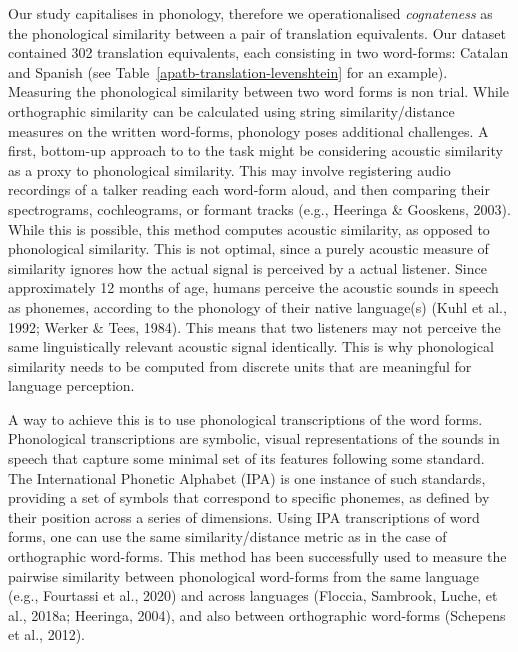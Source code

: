 \documentclass[
  man,
  floatsintext,
  colorlinks=true,linkcolor=blue,citecolor=blue,urlcolor=blue,biblatex]{apa7}
\begin{document}
Our study capitalises in phonology, therefore we operationalised
\emph{cognateness} as the phonological similarity between a pair of
translation equivalents. Our dataset contained 302 translation
equivalents, each consisting in two word-forms: Catalan and Spanish (see
Table~\ref{apatb-translation-levenshtein} for an example). Measuring the
phonological similarity between two word forms is non trial. While
orthographic similarity can be calculated using string
similarity/distance measures on the written word-forms, phonology poses
additional challenges. A first, bottom-up approach to to the task might
be considering acoustic similarity as a proxy to phonological
similarity. This may involve registering audio recordings of a talker
reading each word-form aloud, and then comparing their spectrograms,
cochleograms, or formant tracks (e.g., Heeringa \& Gooskens, 2003).
While this is possible, this method computes acoustic similarity, as
opposed to phonological similarity. This is not optimal, since a purely
acoustic measure of similarity ignores how the actual signal is
perceived by a actual listener. Since approximately 12 months of age,
humans perceive the acoustic sounds in speech as phonemes, according to
the phonology of their native language(s) (Kuhl et al., 1992; Werker \&
Tees, 1984). This means that two listeners may not perceive the same
linguistically relevant acoustic signal identically. This is why
phonological similarity needs to be computed from discrete units that
are meaningful for language perception.

A way to achieve this is to use phonological transcriptions of the word
forms. Phonological transcriptions are symbolic, visual representations
of the sounds in speech that capture some minimal set of its features
following some standard. The International Phonetic Alphabet (IPA) is
one instance of such standards, providing a set of symbols that
correspond to specific phonemes, as defined by their position across a
series of dimensions. Using IPA transcriptions of word forms, one can
use the same similarity/distance metric as in the case of orthographic
word-forms. This method has been successfully used to measure the
pairwise similarity between phonological word-forms from the same
language (e.g., Fourtassi et al., 2020) and across languages (Floccia,
Sambrook, Luche, et al., 2018a; Heeringa, 2004), and also between
orthographic word-forms (Schepens et al., 2012).
\end{document}
